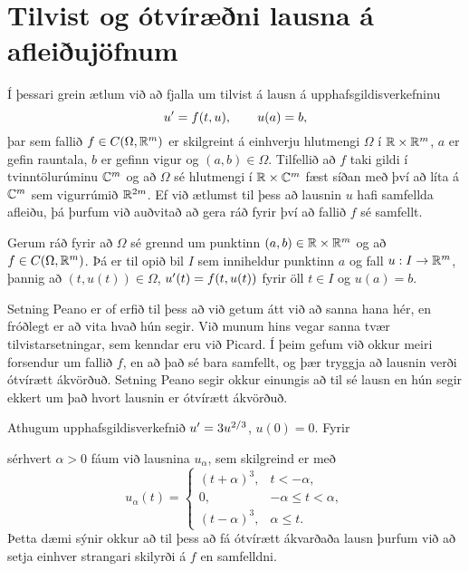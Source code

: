 \section{Tilvist og ótvíræðni lausna á afleiðujöfnum}

\noindent
Í þessari grein ætlum við að fjalla um
tilvist á lausn á upphafsgildisverkefninu
 \begin{equation*}u{\sp{\prime}}=f(t,u),  \qquad u(a)=b,\label{1.7.1}
 \end{equation*}
þar sem fallið $f\in C(\Omega,{\mathbb R}^m)$ er skilgreint á einhverju
hlutmengi $\Omega$ í 
${\mathbb R}\times {\mathbb R}^m$, $a$ er gefin rauntala, $b$ er gefinn vigur og
$(a,b)\in \Omega$.  Tilfellið að $f$ taki gildi í tvinntölurúminu
${\mathbb C}^m$ og  að $\Omega$ sé hlutmengi í  ${\mathbb R}\times {\mathbb C}^m$ fæst síðan með
því að líta á ${\mathbb C}^m$ sem vigurrúmið ${\mathbb R}^{2m}$.  Ef við ætlumst til þess að
lausnin $u$ hafi samfellda afleiðu, þá þurfum við auðvitað að gera
ráð fyrir því að fallið $f$ sé samfellt.

\begin{se}  
Gerum ráð fyrir að $\Omega$ sé grennd um punktinn $(a,b)\in
{\mathbb R}\times{\mathbb R}^m$ og að $f\in C(\Omega,{\mathbb R}^m)$.  Þá
er til opið bil $I$ sem inniheldur punktinn $a$ og fall $u:I\to {\mathbb R}^m$,
þannig að $(t,u(t))\in \Omega$,  
$u{\sp{\prime}}(t)=f(t,u(t))$ fyrir öll $t\in I$ og $u(a)=b$. 
\end{se}



Setning Peano er of erfið til þess að við getum átt við að sanna hana
hér, en fróðlegt er að vita hvað hún segir. Við munum hins vegar
sanna tvær tilvistarsetningar, sem kenndar eru við Picard.  Í þeim
gefum við okkur meiri forsendur um fallið $f$, en að það sé bara
samfellt, og þær tryggja að lausnin
verði ótvírætt ákvörðuð.  Setning Peano segir okkur
einungis að til sé lausn en hún segir ekkert um það hvort lausnin er
ótvírætt ákvörðuð.  


\begin{sy}\label{syn1.7.2}
\hfill Athugum upphafsgildisverkefnið
$u{\sp{\prime}}=3u^{2/3}$, $u(0)=0$.  Fyrir 


 {}
\noindent sérhvert $\alpha>0$ fáum við
lausnina $u_\alpha$, sem skilgreind er með
 $$
 u_\alpha(t)=\begin{cases}
(t+\alpha)^3, &t<-\alpha,\\
0, &-\alpha\leq t<\alpha,\\
(t-\alpha)^3, &\alpha\leq t.
\end{cases}
 $$
Þetta dæmi sýnir okkur að til
þess að fá ótvírætt ákvarðaða lausn þurfum við að setja einhver
strangari skilyrði á $f$ en samfelldni.
\end{sy}

